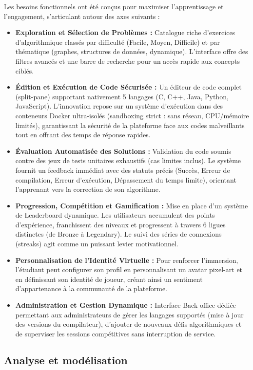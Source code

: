 \documentclass[12pt,a4paper]{report}
\begin{document}
	Les besoins fonctionnels ont été conçus pour maximiser l'apprentissage et l'engagement, s'articulant autour des axes suivants :
	\begin{itemize}
		\item \textbf{Exploration et Sélection de Problèmes :} Catalogue riche d'exercices d'algorithmique classés par difficulté (Facile, Moyen, Difficile) et par thématique (graphes, structures de données, dynamique). L'interface offre des filtres avancés et une barre de recherche pour un accès rapide aux concepts ciblés.
		\item \textbf{Édition et Exécution de Code Sécurisée :} Un éditeur de code complet (split-pane) supportant nativement 5 langages (C, C++, Java, Python, JavaScript). L'innovation repose sur un système d'exécution dans des conteneurs Docker ultra-isolés (sandboxing strict : sans réseau, CPU/mémoire limités), garantissant la sécurité de la plateforme face aux codes malveillants tout en offrant des temps de réponse rapides.
		\item \textbf{Évaluation Automatisée des Solutions :} Validation du code soumis contre des jeux de tests unitaires exhaustifs (cas limites inclus). Le système fournit un feedback immédiat avec des statuts précis (Succès, Erreur de compilation, Erreur d'exécution, Dépassement du temps limite), orientant l'apprenant vers la correction de son algorithme.
		\item \textbf{Progression, Compétition et Gamification :} Mise en place d'un système de Leaderboard dynamique. Les utilisateurs accumulent des points d'expérience, franchissent des niveaux et progressent à travers 6 ligues distinctes (de Bronze à Legendary). Le suivi des séries de connexions (streaks) agit comme un puissant levier motivationnel.
		\item \textbf{Personnalisation de l'Identité Virtuelle :} Pour renforcer l'immersion, l'étudiant peut configurer son profil en personnalisant un avatar pixel-art et en définissant son identité de joueur, créant ainsi un sentiment d'appartenance à la communauté de la plateforme.
		\item \textbf{Administration et Gestion Dynamique :} Interface Back-office dédiée permettant aux administrateurs de gérer les langages supportés (mise à jour des versions du compilateur), d'ajouter de nouveaux défis algorithmiques et de superviser les sessions compétitives sans interruption de service.
	\end{itemize}

	\subsection{Analyse et modélisation}
	
\end{document}
